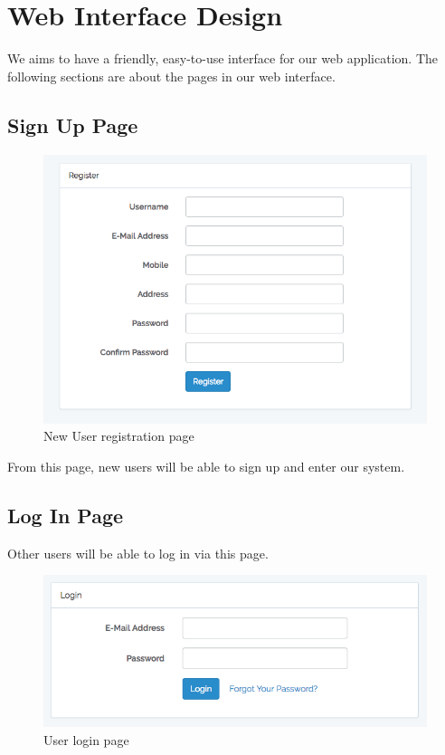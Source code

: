 \newpage

\section{Web Interface Design}
We aims to have a friendly, easy-to-use interface for our web application. The following sections are about the pages in our web interface.
\subsection{Sign Up Page}
\begin{figure}[h]
      \centering
	\includegraphics[scale=0.5]{register.png}
      \caption{New User registration page}
\end{figure}
From this page, new users will be able to sign up and enter our system.

\subsection{Log In Page}
Other users will be able to log in via this page.
\begin{figure}[h]
      \centering
	\includegraphics[scale=0.5]{login.png}
      \caption{User login page}
\end{figure}
\newpage

